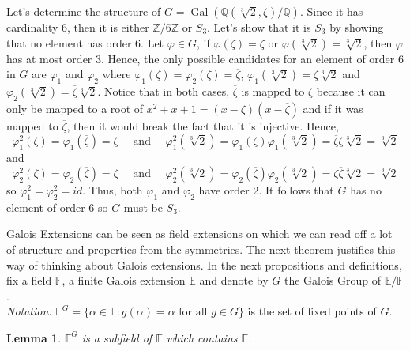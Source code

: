 \documentclass{article}
\theoremstyle{plain}
\newtheorem{lemma}[theorem]{Lemma}
\theoremstyle{definition}
\newcommand{\Q}{\mathbb{Q}}
\newcommand{\F}{\mathbb{F}}
\newcommand{\E}{\mathbb{E}}
\newcommand{\Zn}[1]{\mathbb{Z}/ #1 \mathbb{Z}}
\DeclareMathOperator{\Gal}{Gal}
\newenvironment{notation}{\noindent\textit{Notation:}}{}
\begin{document}
Let's determine the structure of $G = \Gal(\Q(\sqrt[3]{2}, \zeta) / \Q)$. Since it has cardinality 6, then it is either $\Zn{6}$ or $S_3$. Let's show that it is $S_3$ by showing that no element has order 6. Let $\varphi \in G$, if $\varphi(\zeta) = \zeta$ or $\varphi(\sqrt[3]{2}) = \sqrt[3]{2}$, then $\varphi$ has at most order 3. Hence, the only possible candidates for an element of order 6 in $G$ are $\varphi_1$ and $\varphi_2$ where $\varphi_1(\zeta) = \varphi_2(\zeta) = \overline{\zeta}$, $\varphi_1(\sqrt[3]{2}) = \zeta \sqrt[3]{2}$ and $\varphi_2(\sqrt[3]{2}) = \overline{\zeta} \sqrt[3]{2}$. Notice that in both cases, $\overline{\zeta}$ is mapped to $\zeta$ because it can only be mapped to a root of $x^2 + x + 1 = (x - \zeta)(x - \overline{\zeta})$ and if it was mapped to $\overline{\zeta}$, then it would break the fact that it is injective. Hence,
$$\varphi_1^2(\zeta) = \varphi_1(\overline{\zeta}) = \zeta \quad \text{ and }\quad \varphi_1^2(\sqrt[3]{2}) = \varphi_1(\zeta)\varphi_1(\sqrt[3]{2}) = \overline{\zeta}\zeta \sqrt[3]{2} = \sqrt[3]{2}$$
and 
$$\varphi_2^2(\zeta) = \varphi_2(\overline{\zeta}) = \zeta \quad \text{ and }\quad \varphi_2^2(\sqrt[3]{2}) = \varphi_2(\overline{\zeta})\varphi_2(\sqrt[3]{2}) = \zeta \overline{\zeta} \sqrt[3]{2} = \sqrt[3]{2}$$
so $\varphi_1^2 = \varphi_2^2 = id$. Thus, both $\varphi_1$ and $\varphi_2$ have order 2. It follows that $G$ has no element of order 6 so $G$ must be $S_3$.


Galois Extensions can be seen as field extensions on which we can read off a lot of structure and properties from the symmetries. The next theorem justifies this way of thinking about Galois extensions. In the next propositions and definitions, fix a field $\F$, a finite Galois extension $\E$ and denote by $G$ the Galois Group of $\E / \F$. \\

\begin{notation}
    $\E^G = \{\alpha \in \E : g(\alpha) = \alpha \text{ for all } g\in G\}$ is the set of fixed points of $G$.
\end{notation}

\begin{lemma}
\label{lemma : fixed points is a subfield of E containing F}
    $\E^G$ is a subfield of $\E$ which contains $\F$.
\end{lemma}
\end{document}
